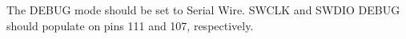The DEBUG mode should be set to Serial Wire. SWCLK and SWDIO DEBUG should populate on pins 111 and 107, respectively.